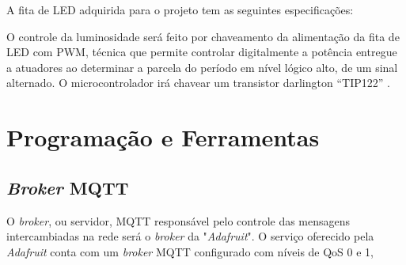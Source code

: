 
A fita de LED adquirida para o projeto tem as seguintes especificações:


O controle da luminosidade será feito por chaveamento da alimentação da fita de LED com \acf{PWM}, técnica que permite controlar digitalmente a potência entregue a atuadores ao determinar a parcela do período em nível lógico alto, de um sinal alternado. O microcontrolador irá chavear um transistor darlington “TIP122” \cite{tip122}.

\section{Programação e Ferramentas}

\subsection{\textit{Broker} MQTT}

O \textit{broker}, ou servidor, MQTT responsável pelo controle das mensagens intercambiadas na rede será o \textit{broker} da "\textit{Adafruit}". O serviço oferecido pela \textit{Adafruit} conta com um  \textit{broker} MQTT configurado com níveis de QoS 0 e 1, 
